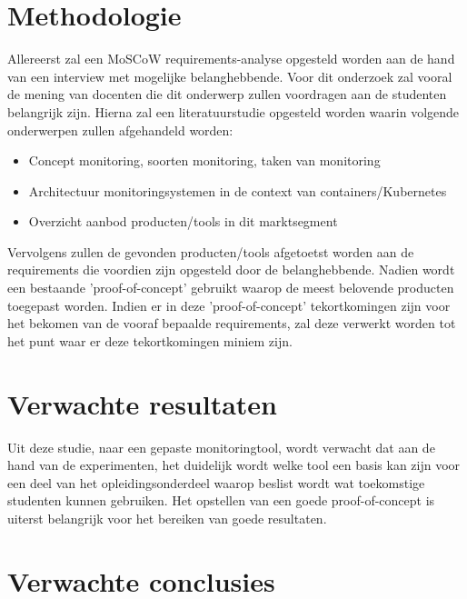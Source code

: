 \section{Methodologie}
\label{sec:methodologie}

Allereerst zal een MoSCoW requirements-analyse opgesteld worden aan de hand van een interview met mogelijke belanghebbende. Voor dit onderzoek zal vooral de mening van docenten die dit onderwerp zullen voordragen aan de studenten belangrijk zijn. Hierna zal een literatuurstudie opgesteld worden waarin volgende onderwerpen zullen afgehandeld worden:

\begin{itemize}
    \item Concept monitoring, soorten monitoring, taken van monitoring
    \item Architectuur monitoringsystemen in de context van containers/Kubernetes
    \item Overzicht aanbod producten/tools in dit marktsegment\\
\end{itemize}

Vervolgens zullen de gevonden producten/tools afgetoetst worden aan de requirements die voordien zijn opgesteld door de belanghebbende. Nadien wordt een bestaande 'proof-of-concept' gebruikt\autocite{Cedric2019} waarop de meest belovende producten toegepast worden. Indien er in deze 'proof-of-concept' tekortkomingen zijn voor het bekomen van de vooraf bepaalde requirements, zal deze verwerkt worden tot het punt waar er deze tekortkomingen miniem zijn. 

\section{Verwachte resultaten}
\label{sec:verwachte_resultaten}

Uit deze studie, naar een gepaste monitoringtool, wordt verwacht dat aan de hand van de experimenten, het duidelijk wordt welke tool een basis kan zijn voor een deel van het opleidingsonderdeel waarop beslist wordt wat toekomstige studenten kunnen gebruiken. Het opstellen van een goede proof-of-concept is uiterst belangrijk voor het bereiken van goede resultaten.

\section{Verwachte conclusies}
\label{sec:verwachte_conclusies}

